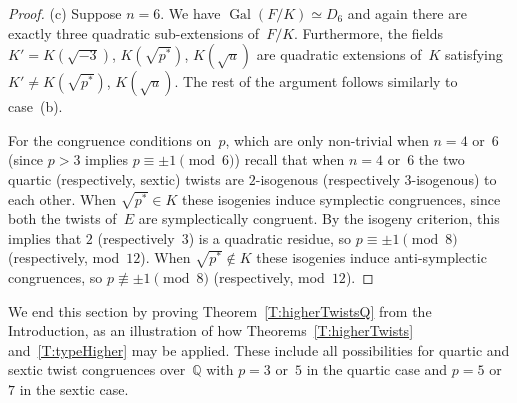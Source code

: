 \documentclass[twoside,leqno,symbols-for-thanks, draft]{rmi}
\numberwithin{equation}{section}
\newcommand{\Q}{\mathbb{Q}}
\DeclareMathOperator{\Gal}{Gal}
\theoremstyle{remark}
\begin{document}
\begin{proof}
(c) Suppose $n=6$. We have $\Gal(F/K) \simeq D_6$ and again there are exactly three quadratic sub-extensions of~$F/K$.
Furthermore, the fields 
$K'=K(\sqrt{-3})$, $K(\sqrt{p^*})$, $K(\sqrt{u})$ 
are quadratic extensions of~$K$ satisfying
$K' \neq K(\sqrt{p^*})$, $K(\sqrt{u})$. 
The rest of the argument follows similarly to case~(b).

For the congruence conditions on~$p$, which are only non-trivial when
$n=4$ or~$6$ (since $p>3$ implies $p\equiv\pm1\pmod6$) recall that
when $n=4$ or~$6$ the two quartic (respectively, sextic) twists are
$2$-isogenous (respectively $3$-isogenous) to each other.  When
$\sqrt{p^*}\in K$ these isogenies induce symplectic congruences, since
both the twists of~$E$ are symplectically congruent.  By the isogeny
criterion, this implies that $2$ (respectively~$3$) is a quadratic
residue, so $p\equiv\pm1\pmod{8}$ (respectively, mod~$12$).  When
$\sqrt{p^*}\notin K$ these isogenies induce anti-symplectic
congruences, so $p\not\equiv\pm1\pmod{8}$ (respectively, mod~$12$).
\end{proof}

We end this section by proving Theorem~\ref{T:higherTwistsQ} from the
Introduction, as an illustration of how Theorems~\ref{T:higherTwists}
and~\ref{T:typeHigher} may be applied.  These include all
possibilities for quartic and sextic twist congruences over~$\Q$ with
$p=3$ or~$5$ in the quartic case and $p=5$ or~$7$ in the sextic case.
\end{document}
